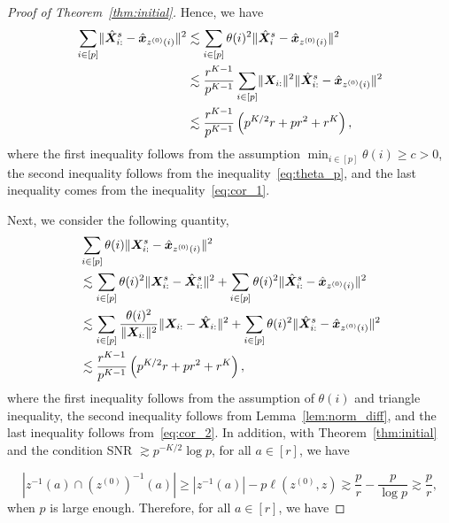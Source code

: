 \documentclass[journal]{IEEEtran}
\theoremstyle{definition}
\theoremstyle{definition}
\newcommand{\of}[1]{\left(#1\right)}
\begin{document}
\begin{proof}[Proof of Theorem~\ref{thm:initial}]
Hence, we have 
\begin{align}
    \sum_{i \in [p]} \onormSize{}{\hat \mX_{i:}^s - \hat \mx_{z^{(0)}(i)}}^2 &\lesssim \sum_{i \in [p]} \theta(i)^2 \onormSize{}{\hat \mX_i^s - \hat \mx_{z^{(0)}(i)}}^2 \\
    &\lesssim \frac{r^{K-1}}{p^{K-1}} \sum_{i \in [p]} \onormSize{}{\mX_{i:}}^2 \onormSize{}{\hat \mX_{i:}^s - \hat \mx_{z^{(0)}(i)}}^2\\
    & \lesssim \frac{r^{K-1}}{p^{K-1}} \of{ p^{K/2}r + pr^2 + r^K },\label{eq:cor_2}
\end{align}
where the first inequality follows from the assumption $\min_{i \in [p]} \theta(i) \geq c > 0$, the second inequality follows from the inequality~\eqref{eq:theta_p}, and the last inequality comes from the inequality~\eqref{eq:cor_1}.

Next, we consider the following quantity,
\begin{align}
    &\sum_{i \in [p]} \theta(i) \onormSize{}{ \mX_{i:}^s - \hat \mx_{z^{(0)}(i)}}^2\\
    &\lesssim \sum_{i \in [p]} \theta(i)^2 \onormSize{}{\mX_{i:}^s - \hat \mX_{i:}^s}^2 + \sum_{i \in [p]} \theta(i)^2 \onormSize{}{\hat \mX_{i:}^s - \hat \mx_{z^{(0)}(i)} }^2\\
    & \lesssim \sum_{i \in [p]} \frac{ \theta(i)^2}{ \onormSize{}{\mX_{i:}}^2} \onormSize{}{\mX_{i:}  - \hat \mX_{i:}}^2 +  \sum_{i \in [p]} \theta(i)^2 \onormSize{}{\hat \mX_{i:}^s - \hat \mx_{z^{(0)}(i)} }^2\\
    & \lesssim \frac{r^{K-1}}{p^{K-1}} \of{ p^{K/2}r + pr^2 + r^K} ,\label{eq:cor_3}
\end{align}
where the first inequality follows from the assumption of $\theta(i)$ and triangle inequality, the second inequality follows from Lemma~\ref{lem:norm_diff}, and the last inequality follows from~\eqref{eq:cor_2}. In addition, with Theorem~\ref{thm:initial} and the condition SNR $\gtrsim p^{-K/2} \log p$, for all $a \in [r]$, we have

\vspace{-0.5cm}
\small
\begin{equation}
    |z^{-1}(a) \cap (z^{(0)})^{-1} (a)| \geq |z^{-1}(a)| - p\ell(z^{(0)} ,  z) \gtrsim \frac{p}{r} - \frac{p}{\log p} \gtrsim \frac{p}{r},
\end{equation}
\normalsize
when $p$ is large enough. Therefore, for all $a \in [r]$, we have


\end{proof}
\end{document}
